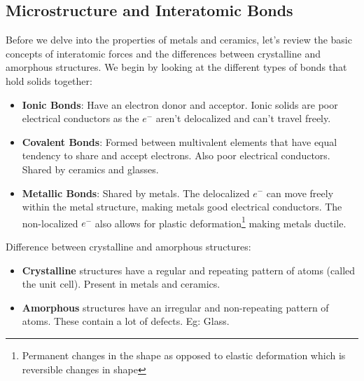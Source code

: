 \documentclass[12pt]{article}
\begin{document}
\subsection{Microstructure and Interatomic Bonds}
Before we delve into the properties of metals and ceramics, let's review the
basic concepts of interatomic forces and the differences between crystalline
and amorphous structures. We begin by looking at the different types of bonds
that hold solids together:
\begin{itemize}
    \item \textbf{Ionic Bonds}: Have an electron donor and acceptor. Ionic solids are poor electrical conductors as the $e^{-}$ aren't delocalized and can't travel freely.
    \item \textbf{Covalent Bonds}: Formed between multivalent elements that have equal tendency to share and accept electrons. Also poor electrical conductors. Shared by ceramics and glasses.
    \item \textbf{Metallic Bonds}: Shared by metals. The delocalized $e^{-}$ can move freely within the metal structure, making metals good electrical conductors. The non-localized $e^{-}$ also allows for plastic deformation\footnote{Permanent changes in the shape as opposed to elastic deformation which is reversible changes in shape} making metals ductile.
\end{itemize}

\noindent
Difference between crystalline and amorphous structures:
\begin{itemize}
    \item \textbf{Crystalline} structures have a regular and repeating pattern of atoms (called the unit cell). Present in metals and ceramics.
    \item \textbf{Amorphous} structures have an irregular and non-repeating pattern of atoms. These contain a lot of defects. Eg: Glass.
\end{itemize}
\end{document}
